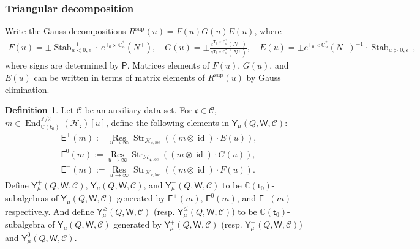 \documentclass[10pt]{amsart}
\theoremstyle{definition}
\newtheorem{Definition}[Theorem]{Definition}
\newtheorem{Remark}[Theorem]{Remark}
\numberwithin{equation}{section}
\newcommand{\bC}{\mathbb{C}}
\newcommand{\bZ}{\mathbb{Z}}
\newcommand{\cH}{\mathcal{H}}
\newcommand{\loc}{\mathrm{loc}}
\newcommand{\sT}{\mathsf{T}}
\newcommand{\sW}{\mathsf{W}}
\newcommand{\End}{\operatorname{End}}
\newcommand{\Res}{\operatorname{Res}}
\newcommand{\Stab}{\operatorname{Stab}}
\newcommand{\str}{\operatorname{Str}}
\newcommand{\id}{\operatorname{id}}
\newcommand{\In}{\operatorname{in}}
\newcommand{\Out}{\operatorname{out}}
\begin{document}


\subsubsection{Triangular decomposition}

Write the Gauss decompositions $R^{\mathrm{sup}}(u)=F(u)G(u)E(u)$, where 
\begin{align}\label{gauss decomp}
    F(u)=\pm\Stab^{-1}_{u<0,\epsilon}\cdot \:e^{\sT_0\times \bC^*_u}(N^+),\quad G(u)=\pm\frac{e^{\sT_0\times \bC^*_u}(N^-)}{e^{\sT_0\times \bC^*_u}(N^+)},\quad E(u)=\pm e^{\sT_0\times \bC^*_u}(N^-)^{-1}\cdot\Stab_{u>0,\epsilon}\:,
\end{align}
where signs are determined by $\mathsf P$. Matrices elements of $F(u)$, $G(u)$, and $E(u)$ can be written in terms of matrix elements of $R^{\mathrm{sup}}(u)$ by Gauss elimination.

\begin{Definition}
Let $\mathcal C$ be an auxiliary data set. For $\mathfrak{c}\in \mathcal C$, $m\in \End^{\bZ/2}_{\bC(\mathsf t_0)}(\cH_{\mathfrak{c}})[u]$, define the following elements in $\mathsf Y_\mu(Q,\sW,\mathcal C)$:
\begin{align*}
    \mathsf E^+(m):=\underset{u\to \infty}{\Res}\str_{\cH_{\mathfrak{c},\loc}}\left((m\otimes \id)\cdot E(u)\right),\\
    \mathsf E^0(m):=\underset{u\to \infty}{\Res}\str_{\cH_{\mathfrak{c},\loc}}\left((m\otimes \id)\cdot G(u)\right),\\
    \mathsf E^-(m):=\underset{u\to \infty}{\Res}\str_{\cH_{\mathfrak{c},\loc}}\left((m\otimes \id)\cdot F(u)\right).
\end{align*}
Define $\mathsf Y^+_\mu(Q,\sW,\mathcal C)$, $\mathsf Y^0_\mu(Q,\sW,\mathcal C)$, and $\mathsf Y^-_\mu(Q,\sW,\mathcal C)$ to be $\bC(\mathsf t_0)$-subalgebras of $\mathsf Y_\mu(Q,\sW,\mathcal C)$ generated by $\mathsf E^+(m)$, $\mathsf E^0(m)$, and $\mathsf E^-(m)$ respectively. And define $\mathsf Y^{\geqslant }_\mu(Q,\sW,\mathcal C)$ (resp. $\mathsf Y^{\leqslant}_\mu(Q,\sW,\mathcal C)$) to be $\bC(\mathsf t_0)$-subalgebra of $\mathsf Y_\mu(Q,\sW,\mathcal C)$ generated by $\mathsf Y^+_\mu(Q,\sW,\mathcal C)$ (resp. $\mathsf Y^-_\mu(Q,\sW,\mathcal C)$) and $\mathsf Y^0_\mu(Q,\sW,\mathcal C)$. 
\end{Definition}
\end{document}
